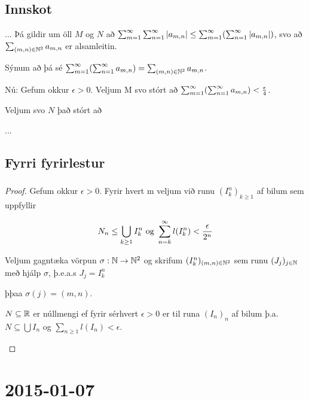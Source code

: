 \documentclass[12pt]{book}
\begin{document}
\section*{Innskot}

{

\def\mn{(m,n)}
\def\amn{a_{m,n}}
\def\summn{\sum_{\mn \in \N^2}}

... %
Þá gildir um öll $M$ og $N$ að $\sum_{m=1}^{\infty} \sum_{n=1}^{\infty} \abs{\amn} \leq \summinfty (\sumoinfty \abs{\amn})$, svo að $\sum_{\mn \in \N^2} \amn$ er alsamleitin.

Sýnum að þá sé $\summinfty ( \sumoinfty \amn ) = \summn \amn$.

Nú: Gefum okkur $\epsilon > 0$. Veljum M svo stórt að $\summinfty ( \sumoinfty \amn ) < \eps{4}$.

Veljum svo $N$ það stórt að

... %


}

\section{Fyrri fyrirlestur}

\subsection{}
\begin{proof}

Gefum okkur $\epsilon > 0$. Fyrir hvert m veljum við runu $(I^n_k)_{k \geq 1}$ af bilum sem uppfyllir

\[N_n \leq \bigcup_{k \geq 1} I_k^n \text{ og } \sum_{n = {k}}^{\infty} l(I^n_k) < \frac{\epsilon}{2^n}\]

Veljum gagntæka vörpun $\sigma: \mathbb{N} \to \mathbb{N}^2$ og skrifum $(I^n_k)_{(m,n) \in \mathbb{N}^2}$ sem runu
$(J_j)_{j \in \mathbb{N}}$ með hjálp $\sigma$, þ.e.a.s $J_j = I^n_k$

þþaa $\sigma (j) = (m,n)$.

\begin{ath}
$N \subseteq \mathbb{R}$ er núllmengi ef fyrir sérhvert $\epsilon > 0$ er til runa $(I_n)_{n}$ af bilum þ.a.
$N \subseteq \bigcup I_n$ og $\sum_{n \geq 1} l(I_n) < \epsilon$.

\end{ath}
\end{proof}
\chapter{2015-01-07}
\end{document}
